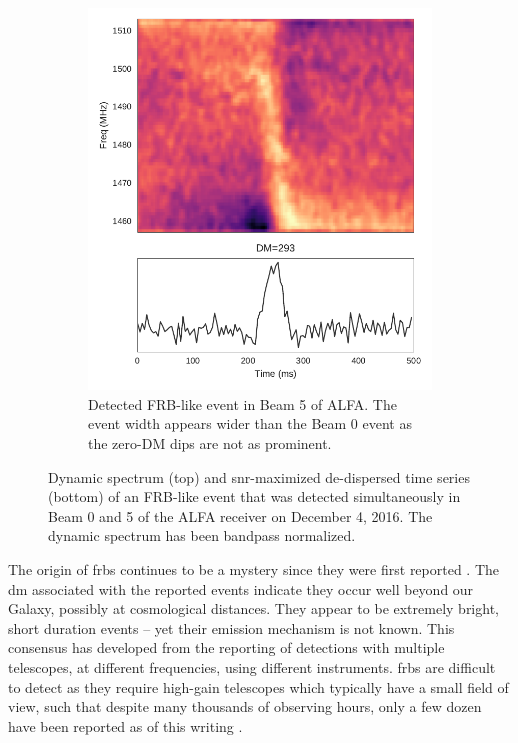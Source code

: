 \documentclass[a4paper,fleqn,usenatbib]{mnras}
\begin{document}
\begin{figure}
\begin{subfigure}[t]{0.45\textwidth}
        \includegraphics[width=1.0\textwidth]{figures/D20161204_buf4_Beam5.pdf}
        \caption{Detected FRB-like event in Beam 5 of ALFA. The event width
        appears wider than the Beam 0 event as the zero-DM dips are not as
        prominent.
        }
        \label{fig:beam5_dynamic_spec}
    \end{subfigure}
    \caption{
    Dynamic spectrum (top) and \gls{snr}-maximized de-dispersed time series
    (bottom) of an FRB-like event that was detected simultaneously in Beam 0 and
    5 of the ALFA receiver on December 4, 2016. The dynamic spectrum has been
    bandpass normalized.
    }
    \label{fig:dynamic_spec}
\end{figure}

The origin of \glspl{frb} continues to be a mystery since they were first
reported \citep{2007Sci...318..777L}. The \gls{dm} associated with the reported
events indicate they occur well beyond our Galaxy, possibly at cosmological
distances. They appear to be extremely bright, short duration events -- yet
their emission mechanism is not known.  This consensus has developed from the
reporting of detections with multiple telescopes, at different frequencies,
using different instruments. \glspl{frb} are difficult to detect as they require
high-gain telescopes which typically have a small field of view, such that
despite many thousands of observing hours, only a few dozen have been reported
as of this writing \citep{2016PASA...33...45P}.
\end{document}
